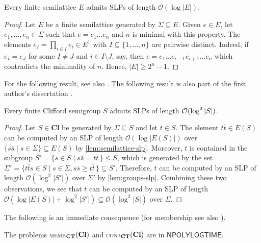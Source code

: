 \documentclass[anonymous,letter,UKenglish,cleveref,autoref,thm-restate]{lipics-v2021}
\renewcommand{\geq}{\geqslant}
\renewcommand{\leq}{\leqslant}
\newcommand{\abs}[1] {\ensuremath\left|#1\right|}
\newcommand{\NPOLYLOGTIME}{\ensuremath{\mathsf{NPOLYLOGTIME}}\xspace}
\newcommand{\vCl}{\ensuremath{\mathbf{Cl}}}
\theoremstyle{plain}
\theoremstyle{plain}
\newcommand{\dMemb}[2][]{\textup{\textsc{memb${}_{\mathbf{#1}}\expandafter\ifx\expandafter\relax\detokenize{#2}\relax\else(#2)\fi$}}}
\newcommand{\dConj}[2][]{\textup{\textsc{conj${}_{\mathbf{#1}}\expandafter\ifx\expandafter\relax\detokenize{#2}\relax\else(#2)\fi$}}}
\begin{document}
\begin{lemma}\label{lem:semilattice-slp}
	Every finite semilattice $E$ admits SLPs of length $\mathcal{O}(\log {}\lvert E \rvert)$.
\end{lemma}
\begin{proof}
	Let $E$ be a finite semilattice generated by $\Sigma \subseteq E$.
	Given $e \in E$, let $e_1, \dotsc, e_n \in \Sigma$ such that $e = e_1 \dotsc e_n$ and $n$ is minimal with this property.
	The elements $e_I = \prod_{i \in I} e_i \in E^1$ with $I \subseteq \{1, \dotsc, n\}$ are pairwise distinct.
	Indeed, if $e_I = e_J$ for some $I \neq J$ and $i \in I \setminus J$, say, then $e = e_1 \dotsc e_{i-1} e_{i+1} \dotsc e_n$ which contradicts the minimality of $n$.
	Hence, $\lvert E \rvert \geq 2^n - 1$.
\end{proof}
\ifAnonimous For the following result, see also \cite[Lemma 4.10]{Fleischer19diss}.
\else The following result is also part of the first author's dissertation \cite[Lemma 4.10]{Fleischer19diss}.
\fi
\begin{lemma}\label{lem:clifford-slp}
	Every finite Clifford semigroup $S$ admits SLPs of length $\mathcal{O}(\log^2 \abs{S})$.
\end{lemma}
\begin{proof}
	Let $S \in \vCl$ be generated by $\Sigma \subseteq S$ and let $t \in S$.
	The element $t \bar t \in E(S)$ can be computed by an SLP of length $\mathcal{O}(\log {} \lvert E(S)\rvert)$ over $\{ s \bar s \mid s \in \Sigma \} \subseteq E(S)$ by \cref{lem:semilattice-slp}.
	Moreover, $t$ is contained in the subgroup $S' = \{ s \in S \mid s \bar s = t \bar t \, \} \leq S$, which is generated by the set $\Sigma' = \{ t \bar t s \in S \mid s \in \Sigma, s \bar s \geq t \bar t\, \} \subseteq S'$.
	Therefore, $t$ can be computed by an SLP of length $\mathcal{O}(\log^2 \lvert S' \rvert)$ over $\Sigma'$ by \cref{lem:groups-slp}.
	Combining these two observations, we see that $t$ can be computed by an SLP of length $\mathcal{O}(\log {} \lvert E(S) \rvert + \log^2 {}\lvert S' \rvert) \subseteq \mathcal{O}(\log^2 \lvert S \rvert)$ over $\Sigma$.
\end{proof}

The following is an immediate consequence (for membership see also \cite{Fleischer19diss}).

\begin{proposition}\label{pro:ctm-clifford}
  The problems \dMemb[CT]{\vCl} and \dConj[CT]{\vCl} are in \NPOLYLOGTIME{}.
\end{proposition}
\end{document}
